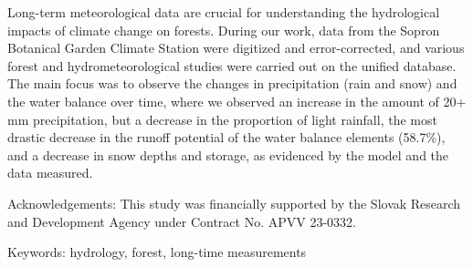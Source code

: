 \noindent

Long-term meteorological data are crucial for understanding the hydrological impacts of climate change on forests. During our work, data from the Sopron Botanical Garden Climate Station were digitized and error-corrected, and various forest and hydrometeorological studies were carried out on the unified database. The main focus was to observe the changes in precipitation (rain and snow) and the water balance over time, where we observed an increase in the amount of 20+ mm precipitation, but a decrease in the proportion of light rainfall, the most drastic decrease in the runoff potential of the water balance elements (58.7\%), and a decrease in snow depths and storage, as evidenced by the model and the data measured.

Acknowledgements: This study was financially supported by the Slovak Research and Development Agency under Contract No. APVV 23-0332.

Keywords: hydrology, forest, long-time measurements

\newpage{}
{}
\begin{flushleft}







\end{flushleft}

\noindent


